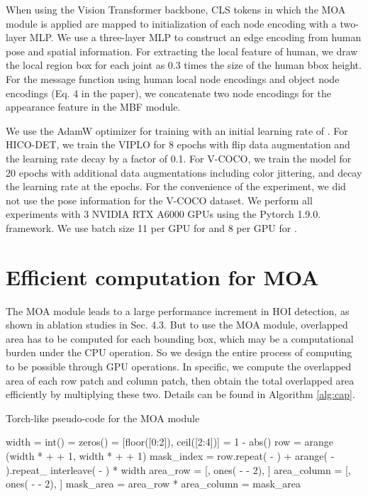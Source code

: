 \documentclass[10pt,twocolumn,letterpaper]{article}
\begin{document}
When using the Vision Transformer backbone, CLS tokens in which the MOA module is applied are mapped to initialization of each node encoding with a two-layer MLP. We use a three-layer MLP to construct an edge encoding from human pose and spatial information. For extracting the local feature of human, we draw the local region box for each joint as 0.3 times the size of the human bbox height. For the message function using human local node encodings and object node encodings (Eq. 4 in the paper), we concatenate two node encodings for the appearance feature in the MBF module. 



We use the AdamW \cite{loshchilov2017decoupled} optimizer for training with an initial learning rate of . For HICO-DET, we train the VIPLO for 8 epochs with flip data augmentation and the learning rate decay by a factor of 0.1. For V-COCO, we train the model for 20 epochs with additional data augmentations including color jittering, and decay the learning rate at the  epochs. For the convenience of the experiment, we did not use the pose information for the V-COCO dataset. We perform all experiments with 3 NVIDIA RTX A6000 GPUs using the Pytorch 1.9.0. framework. We use batch size 11 per GPU for  and 8 per GPU for .

\section{Efficient computation for MOA}
\label{app:b}
The MOA module leads to a large performance increment in HOI detection, as shown in ablation studies in Sec. 4.3. But to use the MOA module, overlapped area  has to be computed for each bounding box, which may be a computational burden under the CPU operation. So we design the entire process of computing  to be possible through GPU operations. In specific, we compute the overlapped area of each row patch and column patch, then obtain the total overlapped area efficiently by multiplying these two. Details can be found in Algorithm \ref{alg:cap}. 



\begin{algorithm}
\caption{Torch-like pseudo-code for the MOA module}\label{alg:cap}
\begin{algorithmic}[1]
\State width = int()
\State  = zeros() 
\State  
\State  = [floor([0:2]), ceil([2:4])]
\State  = 1 - abs()
\State 
\State 
\State row = arange (width *  +  + 1, width *  +  + 1)
\State mask\_index = row.repeat( - ) + arange( - ).repeat\_ interleave( - ) * width
\State area\_row = [, ones( -  - 2), ]
\State area\_column = [, ones( -  - 2), ]
\State mask\_area = area\_row * area\_column
 = mask\_area
\end{algorithmic}
\end{algorithm}
\end{document}
